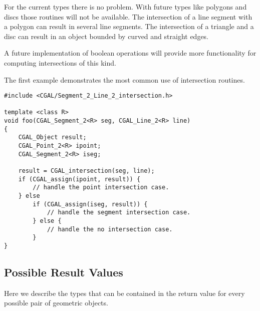 For the current types there is no problem.
With future types like polygons and discs those routines will not be
available.
The intersection of a line segment with a polygon can result in several line
segments.
The intersection of a triangle and a disc can result in an object bounded by
curved and straight edges.

A future implementation of boolean operations will provide more functionality
for computing intersections of this kind.


\example

The first example demonstrates the most common use of intersection routines.
\begin{verbatim}
#include <CGAL/Segment_2_Line_2_intersection.h>

template <class R>
void foo(CGAL_Segment_2<R> seg, CGAL_Line_2<R> line)
{
    CGAL_Object result;
    CGAL_Point_2<R> ipoint;
    CGAL_Segment_2<R> iseg;

    result = CGAL_intersection(seg, line);
    if (CGAL_assign(ipoint, result)) {
        // handle the point intersection case.
    } else
        if (CGAL_assign(iseg, result)) {
            // handle the segment intersection case.
        } else {
            // handle the no intersection case.
        }
}
\end{verbatim}




\subsection{Possible Result Values}
\label{all_intersection_results}

Here we describe the types that can be contained in the 
return value for every possible pair of geometric objects.

